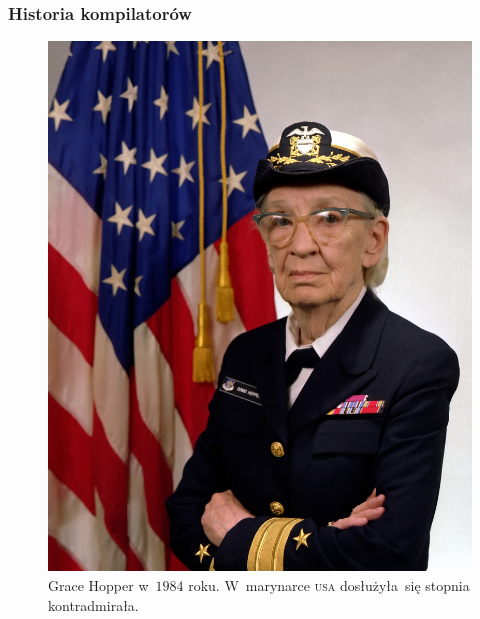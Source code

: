 \documentclass[10pt,t]{beamer}
\begin{document}
\begin{frame}
  \frametitle{Historia kompilatorów}

  \vspace{-0.5em}



  \begin{figure}

    \centering


    \includegraphics[scale=0.25]
    {./Presentations-pictures/Grace-Hopper-in-1984.jpeg}

    \caption{Grace Hopper w~$1984$ roku. W~marynarce \textsc{usa}
      dosłużyła~się stopnia kontradmirała.}

  \end{figure}

\end{frame}
\end{document}
